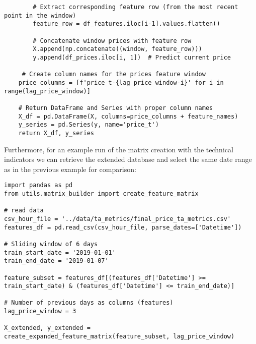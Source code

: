 \documentclass[12pt]{report} %
\begin{document}
\begin{lstlisting}
        # Extract corresponding feature row (from the most recent point in the window)
        feature_row = df_features.iloc[i-1].values.flatten()

        # Concatenate window prices with feature row
        X.append(np.concatenate((window, feature_row)))
        y.append(df_prices.iloc[i, 1])  # Predict current price

     # Create column names for the prices feature window
    price_columns = [f'price_t-{lag_price_window-i}' for i in range(lag_price_window)]

    # Return DataFrame and Series with proper column names
    X_df = pd.DataFrame(X, columns=price_columns + feature_names)
    y_series = pd.Series(y, name='price_t')
    return X_df, y_series
\end{lstlisting}

Furthermore, for an example run of the matrix creation with the technical indicators we can retrieve the extended database and select the same date range as in the previous example for comparison:
\begin{lstlisting}
import pandas as pd
from utils.matrix_builder import create_feature_matrix

# read data
csv_hour_file = '../data/ta_metrics/final_price_ta_metrics.csv'
features_df = pd.read_csv(csv_hour_file, parse_dates=['Datetime'])

# Sliding window of 6 days
train_start_date = '2019-01-01'
train_end_date = '2019-01-07'

feature_subset = features_df[(features_df['Datetime'] >= train_start_date) & (features_df['Datetime'] <= train_end_date)]

# Number of previous days as columns (features)
lag_price_window = 3

X_extended, y_extended = create_expanded_feature_matrix(feature_subset, lag_price_window)
\end{lstlisting}
\end{document}
